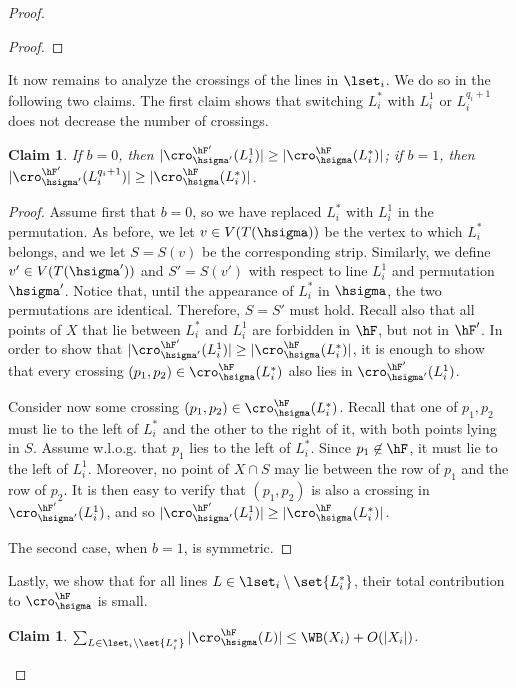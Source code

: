 \documentclass[11pt]{article}
\numberwithin{equation}{section}
\newtheorem{claim}[theorem]{Claim}
\theoremstyle{definition}
\theoremstyle{plain}
\begin{document}
\begin{proof}
\begin{proof}
	\end{proof}
	
	It now remains to analyze the crossings of the lines in $\lset_i$. We do so in the following two claims. The first claim shows that switching $L^*_i$ with $L^1_i$ or $L^{q_i+1}_i$ does not decrease the number of crossings.
	
	\begin{claim}
		If $b=0$, then	$|\cro^{\hF'}_{\hsigma'}(L_i^1)|\geq |\cro^{\hF}_{\hsigma}(L^*_i)|$; if $b=1$, then $|\cro^{\hF'}_{\hsigma'}(L_i^{q_i+1})|\geq |\cro^{\hF}_{\hsigma}(L^*_i)|$.
	\end{claim}
	
	\begin{proof}
		Assume first that $b=0$, so we have replaced $L^*_i$ with $L_i^1$ in the permutation. As before, we let $v\in V(T({\hsigma}))$ be the vertex to which $L^*_i$ belongs, and we let $S=S(v)$ be the corresponding strip. Similarly, we define $v'\in V(T({\hsigma'}))$ and $S'=S(v')$ with respect to line $L_i^1$ and permutation $\hsigma'$. Notice that, until the appearance of $L^*_i$ in $\hsigma$, the two permutations are identical. Therefore, $S=S'$ must hold. Recall also that all points of $X$ that lie between $L^*_i$ and $L_i^1$ are forbidden in $\hF$, but not in $\hF'$. In order to show that $|\cro^{\hF'}_{\hsigma'}(L_i^1)|\geq |\cro^{\hF}_{\hsigma}(L^*_i)|$, it is enough to show that every crossing $(p_1,p_2)\in \cro^{\hF}_{\hsigma}(L^*_i)$ also lies in $\cro^{\hF'}_{\hsigma'}(L_i^1)$. 
		
		Consider now some crossing $(p_1,p_2)\in \cro^{\hF}_{\hsigma}(L^*_i)$. Recall that one of $p_1,p_2$ must lie to the left of $L_i^*$ and the other to the right of it, with both points lying in $S$. Assume w.l.o.g. that $p_1$ lies to the left of $L_i^*$. Since $p_1\not\in \hF$, it must lie to the left of $L^1_i$. Moreover, no point of $X\cap S$ may lie between the row of $p_1$ and the row of $p_2$. It is then easy to verify that $(p_1,p_2)$ is also a crossing in $\cro^{\hF'}_{\hsigma'}(L_i^1)$, and so $|\cro^{\hF'}_{\hsigma'}(L_i^1)|\geq |\cro^{\hF}_{\hsigma}(L^*_i)|$.
		
		The second case, when $b=1$, is symmetric.
	\end{proof}
	
	Lastly, we show that for all lines $L\in \lset_i\setminus\set{L_i^*}$, their total contribution to $\cro^{\hF}_{\hsigma}$ is small. 
	
	\begin{claim}\label{claim: lines in li contribute little}
		$\sum_{L\in \lset_i\setminus\set{L_i^*}}|\cro^{\hF}_{\hsigma}(L)|\leq \WB(X_i)+O(|X_i|)$.
	\end{claim}
	

\end{proof}
\end{document}
